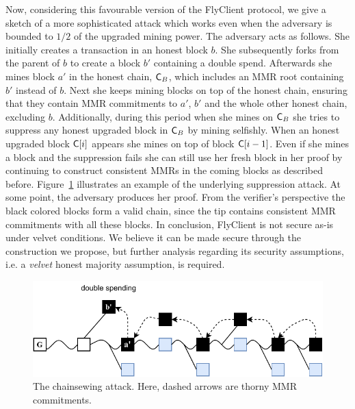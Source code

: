 	Now, considering this favourable version of the FlyClient protocol, we give a sketch of a more sophisticated attack which works
	even when the adversary is bounded to $1/2$ of the upgraded mining power.
    The adversary acts as follows.
		She initially creates a transaction in an honest block $b$. She subsequently forks from the parent of $b$ to create a block $b'$ containing
		a double spend.
    Afterwards she mines block $a'$ in the honest chain, $\mathsf{C}_B$, which includes an MMR root containing $b'$ instead of $b$.
    Next she keeps mining blocks on top of the honest chain, ensuring that they contain MMR commitments to
		$a'$, $b'$ and the whole other honest chain, excluding $b$.
    Additionally, during this period when she mines on $\mathsf{C}_B$ she tries to suppress any honest upgraded block in $\mathsf{C}_B$ by mining selfishly.
    When an honest upgraded block $\mathsf{C}[i]$ appears she mines on top of block $\mathsf{C}[i-1]$.
    Even if she mines a block and the suppression fails she can still use her fresh block in her proof by continuing to construct consistent MMRs
    in the coming blocks as described before.
		Figure~\ref{fig:combined_chainsewing_flyclient} illustrates an example of the underlying suppression attack.
    At some point, the adversary produces her proof.
    From the verifier's perspective the black colored blocks form a valid chain,
    since the tip contains consistent MMR commitments with all these blocks.
	In conclusion, FlyClient is not secure as-is under velvet conditions. We believe it can be made secure through the construction we propose,
	but further analysis regarding its security assumptions, i.e. a \emph{velvet} honest majority assumption, is required.

	\begin{figure}
		\begin{center}
			\includegraphics[width=0.95\columnwidth]{figures/flyclient_combined_attack.pdf}
		\end{center}
		\caption{The chainsewing attack. Here, dashed arrows are thorny MMR commitments.}
		\label{fig:combined_chainsewing_flyclient}
	\end{figure}
